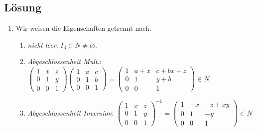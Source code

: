 \subsection{Lösung}
\begin{enumerate}
	\item Wir weisen die Eigenschaften getrennt nach.
	\begin{enumerate}
	 	\item \emph{nicht leer}: \( I_3 \in N \neq \varnothing \). 
	 	\item \emph{Abgeschlossenheit Mult.}: \( \begin{pmatrix}
	 		1 & x & z \\
	 		0 & 1 & y \\
	 		0 & 0 & 1
	 	\end{pmatrix} \begin{pmatrix}
	 		1 & a & c \\
	 		0 & 1 & b \\
	 		0 & 0 & 1
	 	\end{pmatrix} = \begin{pmatrix}
	 		1 & a+x & c+bx+z \\
	 		0 & 1 & y+b \\
	 		0 & 0 & 1
	 	\end{pmatrix} \in N \)

	 	\item \emph{Abgeschlossenheit Inversion}: \( \begin{pmatrix}
	 		1 & x & z \\
	 		0 & 1 & y \\
	 		0 & 0 & 1 
	 	\end{pmatrix}^{-1} = \begin{pmatrix}
	 		1 & -x & -z+xy \\
	 		0 & 1 & -y \\
	 		0 & 0 & 1
	 	\end{pmatrix} \in N \)
	 \end{enumerate} 


\end{enumerate}
